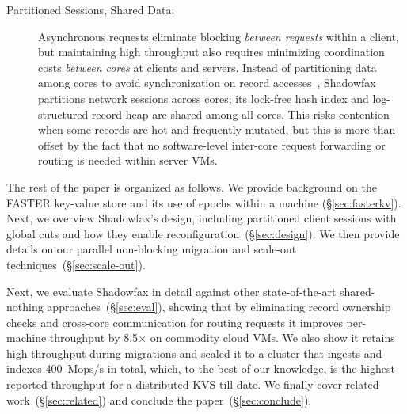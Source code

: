 \begin{description}
\item[Partitioned Sessions, Shared Data:]
Asynchronous requests eliminate blocking {\em between requests} within a client, but
maintaining high throughput also requires minimizing coordination
costs {\em between cores} at clients and servers.
%
Instead of partitioning data among cores to avoid synchronization on record
accesses~\cite{hstore,voltdb,mica,seastar}, Shadowfax partitions network
sessions across cores; its lock-free hash index and log-structured record heap
are shared among all cores.
%
This risks contention when some records are hot and frequently
mutated, but this is more than offset by the fact that no software-level
inter-core request forwarding or routing is needed within server VMs.

\end{description}

The rest of the paper is organized as follows. We provide background on the FASTER
key-value store and its use of epochs within a machine (\S\ref{sec:fasterkv}). Next,
we overview Shadowfax's design, including partitioned client
sessions with global cuts and how they enable
reconfiguration~(\S\ref{sec:design}). We then provide details on our parallel
non-blocking migration and scale-out techniques~(\S\ref{sec:scale-out}).
%
\iffalse
In the remainder of this paper, we describe how the key synchronization
mechanisms at the core of \faster{}'s design (\S\ref{sec:epochs}) naturally led
to Shadowfax's sessions that extend global cuts over the network
(\S\ref{sec:sessions}). We describe how this enables Shadowfax to perform the
same over the network as with a local \faster{}
instance~(\S\ref{sec:eval:clients}), and we describe how they enable
reconfiguration~(\S\ref{sec:ownership}) and parallel data
migration~(\S\ref{sec:scale-out}). We also describe how Shadowfax does this
while supporting larger-than-memory datasets that span SSD and cloud blob
storage.
\fi
%
Next, we evaluate Shadowfax in detail against other state-of-the-art shared-nothing
approaches~(\S\ref{sec:eval}), showing that by eliminating record ownership
checks and cross-core communication for routing requests it improves
per-machine throughput by 8.5$\times$ on commodity cloud VMs.
%
We also show it retains high throughput during migrations and scaled it
to a
cluster that ingests and indexes 400~Mops/s in total,
%
which, to the best of our knowledge, is the highest
reported throughput for a distributed KVS till date. We finally cover
related work~(\S\ref{sec:related}) and conclude the paper~(\S\ref{sec:conclude}).
